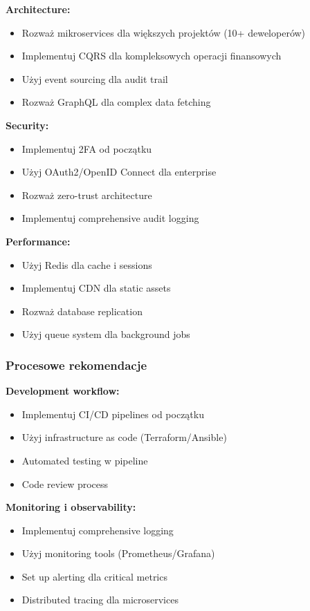 \documentclass[12pt,a4paper]{article}
\begin{document}
    \textbf{Architecture:}
    \begin{itemize}
        \item Rozważ mikroservices dla większych projektów (10+ deweloperów)
        \item Implementuj CQRS dla kompleksowych operacji finansowych
        \item Użyj event sourcing dla audit trail
        \item Rozważ GraphQL dla complex data fetching
    \end{itemize}

    \textbf{Security:}
    \begin{itemize}
        \item Implementuj 2FA od początku
        \item Użyj OAuth2/OpenID Connect dla enterprise
        \item Rozważ zero-trust architecture
        \item Implementuj comprehensive audit logging
    \end{itemize}

    \textbf{Performance:}
    \begin{itemize}
        \item Użyj Redis dla cache i sessions
        \item Implementuj CDN dla static assets
        \item Rozważ database replication
        \item Użyj queue system dla background jobs
    \end{itemize}

    \subsubsection{Procesowe rekomendacje}

    \textbf{Development workflow:}
    \begin{itemize}
        \item Implementuj CI/CD pipelines od początku
        \item Użyj infrastructure as code (Terraform/Ansible)
        \item Automated testing w pipeline
        \item Code review process
    \end{itemize}

    \textbf{Monitoring i observability:}
    \begin{itemize}
        \item Implementuj comprehensive logging
        \item Użyj monitoring tools (Prometheus/Grafana)
        \item Set up alerting dla critical metrics
        \item Distributed tracing dla microservices
    \end{itemize}
\end{document}
